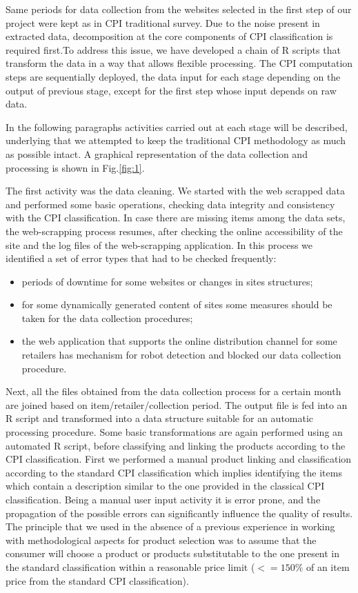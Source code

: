 \documentclass[]{article}
\begin{document}
Same periods for data collection from the websites selected in the first step of our project were kept as in CPI traditional survey. 
Due to the noise present in extracted data, 
decomposition at the core components of CPI classification is required first.To address this issue, we have 
developed a chain of R scripts that transform the data in a way that allows flexible processing. The CPI computation steps 
are sequentially deployed, the data input for each stage depending on the output of previous stage, 
except for the first step whose input depends on raw data.

In the following paragraphs activities carried out at each stage will be described, underlying that we attempted to keep the 
traditional CPI methodology as much as possible intact. A graphical representation of the data collection and processing is shown in Fig.\ref{fig:1}.



The first activity was the data cleaning. We started with 
the web scrapped data and performed some basic operations, checking data integrity and consistency with the CPI classification. 
In case there are missing items among the data sets, the web-scrapping process resumes, after checking the online accessibility 
of the site and the log files of the web-scrapping application. In this process we identified a set of error types that had to be checked frequently: 
\begin{itemize}
\item periods of downtime for some websites or changes in sites structures;
\item for some dynamically generated content of sites some measures should be taken for the data collection procedures;
\item the web application that supports the online distribution channel for some retailers has mechanism for robot detection and blocked our data collection 
procedure.
\end{itemize}


Next, all the files obtained from the data collection process for a certain month are joined based on item/retailer/collection period. The output 
file is fed into an R script and transformed into a data structure suitable for an automatic processing procedure. Some 
basic transformations are again performed using an automated R script, before classifying and linking the products according 
to the CPI classification. First we performed a manual product linking and classification according to the standard CPI 
classification which implies identifying the items which contain a description similar to the one provided in the
classical CPI classification. Being a manual user input activity it is error prone, and the propagation of the possible errors can significantly influence the quality of results. The principle that we used in the absence of a previous experience in working with methodological aspects 
for product selection was to assume that the consumer will choose a product or products substitutable to the one present 
in the standard classification within a reasonable price limit ($<= 150\%$ of an item price from the standard CPI classification). 
\end{document}
